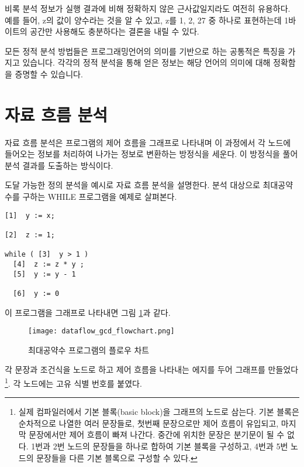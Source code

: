 \documentclass[a4paper]{book}
\begin{document}
비록 분석 정보가 실행 결과에 비해 정확하지 않은 근사값일지라도 여전히
유용하다.  예를 들어, z의 값이 양수라는 것을 알 수 있고, z를 1, 2, 27
중 하나로 표현하는데 1바이트의 공간만 사용해도 충분하다는 결론을 내릴
수 있다.

모든 정적 분석 방법들은 프로그래밍언어의 의미를 기반으로 하는 공통적은
특징을 가지고 있습니다. 각각의 정적 분석을 통해 얻은 정보는 해당
언어의 의미에 대해 정확함을 증명할 수 있습니다.

\section{자료 흐름 분석}

자료 흐름 분석은 프로그램의 제어 흐름을 그래프로 나타내며 이 과정에서
각 노드에 들어오는 정보를 처리하여 나가는 정보로 변환하는 방정식을
세운다. 이 방정식을 풀어 분석 결과를 도출하는 방식이다.

도달 가능한 정의 분석을 예시로 자료 흐름 분석을 설명한다.
%
분석 대상으로 최대공약수를 구하는 WHILE 프로그램을 예제로 살펴본다.

\begin{center}
\begin{minipage}[h]{.7\textwidth}
  \begin{lstlisting}
[1]  y := x;

[2]  z := 1;

while ( [3]  y > 1 )
  [4]  z := z * y ;
  [5]  y := y - 1

  [6]  y := 0
  \end{lstlisting}
\end{minipage}
\end{center}

이 프로그램을 그래프로 나타내면 그림
\ref{fig:dataflow_gcd_flowchart}과 같다. 

\begin{figure}[ht]
\begin{center}
  \texttt{[image: dataflow\_gcd\_flowchart.png]}
\end{center}
\caption{최대공약수 프로그램의 플로우 차트}
\label{fig:dataflow_gcd_flowchart}
\end{figure}

각 문장과 조건식을 노드로 하고 제어 흐름을 나타내는 에지를 두어
그래프를 만들었다\footnote{실제 컴파일러에서 기본 블록(basic block)을
그래프의 노드로 삼는다.
%
기본 블록은 순차적으로 나열한 여러 문장들로, 첫번째 문장으로만 제어
흐름이 유입되고, 마지막 문장에서만 제어 흐름이 빠져 나간다. 중간에
위치한 문장은 분기문이 될 수 없다.
%
1번과 2번 노드의 문장들을 하나로 합하여 기본 블록을 구성하고, 4번과
5번 노드의 문장들을 다른 기본 블록으로 구성할 수 있다.}.
%
각 노드에는 고유 식별 번호를 붙였다.
\end{document}

